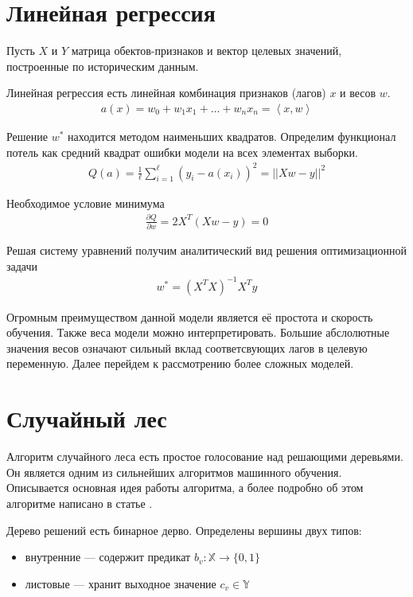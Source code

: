 \section{Линейная регрессия} 
\label{sec:LR}

Пусть $X$ и $Y$ матрица обектов-признаков и вектор целевых значений, построенные по историческим данным.

Линейная регрессия есть линейная комбинация признаков (лагов) $x$ и весов $w$.
\begin{align}
	a(x) = w_0 + w_1 x_1 + \dots + w_n x_n = \left< x, w \right>
\end{align}

Решение $w^*$ находится методом наименьших квадратов. 
Определим функционал потель как средний квадрат ошибки модели на всех элементах выборки.
\begin{align}
	Q(a) = \frac{1}{\ell} \sum_{i=1}^{\ell} \left( y_i - a(x_i)\right)^2 = ||Xw - y||^2
\end{align}

Необходимое условие минимума
\begin{align}
	\frac{\partial Q}{ \partial w} = 2X^T(Xw - y) = 0
\end{align}

Решая систему уравнений получим аналитический вид решения оптимизационной задачи
\begin{align}
	w^* = \left(X^TX\right)^{-1}X^Ty
\end{align}

Огромным преимуществом данной модели является её простота и скорость обучения. Также веса модели можно интерпретировать.
Большие абслолютные значения весов означают сильный вклад соответсвующих лагов в целевую переменную. Далее перейдем к
рассмотрению более сложных моделей.


\section{Случайный лес}
\label{sec:RF}

Алгоритм случайного леса есть простое голосование над решающими деревьями. Он является одним из сильнейших алгоритмов машинного обучения.
Описывается основная идея работы алгоритма, а более подробно об этом алгоритме написано в статье \cite{random_forest}.

Дерево решений есть бинарное дерво. Определены вершины двух типов: 
\begin{itemize}
	\item внутренние --- содержит предикат $b_v : \mathbb{X}\rightarrow \{0, 1\}$
	\item листовые --- хранит выходное значение $c_v \in \mathbb{Y}$
\end{itemize}

